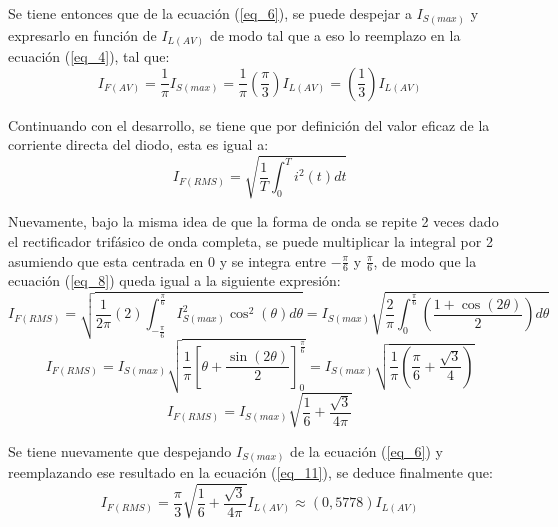 \documentclass[12pt,a4paper]{article}
\begin{document}
Se tiene entonces que de la ecuación (\ref{eq_6}), se puede despejar a $I_{S(max)}$ y expresarlo en función de $I_{L(AV)}$ de modo tal que a eso lo reemplazo en la ecuación (\ref{eq_4}), tal que:
\begin{equation}
    I_{F(AV)} = \frac{1}{\pi} I_{S(max)} = \frac{1}{\pi} \left(\frac{\pi}{3}\right) I_{L(AV)} = \left(\frac{1}{3}\right) I_{L(AV)}
    \label{eq_7}
\end{equation}

Continuando con el desarrollo, se tiene que por definición del valor eficaz de la corriente directa del diodo, esta es igual a:
\begin{equation}
    I_{F(RMS)} = \sqrt{\frac{1}{T} \int_{0}^{T} i^{2}(t)dt}
    \label{eq_8}
\end{equation}

Nuevamente, bajo la misma idea de que la forma de onda se repite 2 veces dado el rectificador trifásico de onda completa, se puede multiplicar la integral por 2 asumiendo que esta centrada en 0 y se integra entre $-\frac{\pi}{6}$ y $\frac{\pi}{6}$, de modo que la ecuación (\ref{eq_8}) queda igual a la siguiente expresión:
\begin{equation}
    I_{F(RMS)} = \sqrt{\frac{1}{2\pi} (2) \int_{-\frac{\pi}{6}}^{\frac{\pi}{6}} I^{2}_{S(max)} \cos^{2}(\theta) d\theta} = I_{S(max)} \sqrt{\frac{2}{\pi} \int_{0}^{\frac{\pi}{6}} \left(\frac{1 + \cos(2\theta)}{2} \right)d\theta}
    \label{eq_9}
\end{equation}
\begin{equation}
    I_{F(RMS)} = I_{S(max)} \sqrt{\frac{1}{\pi} \left[ \theta + \frac{\sin(2\theta)}{2}\right]_{0}^{\frac{\pi}{6}}} = I_{S(max)} \sqrt{\frac{1}{\pi} \left(\frac{\pi}{6} + \frac{\sqrt{3}}{4}\right)}
    \label{eq_10}
\end{equation}
\begin{equation}
    I_{F(RMS)} = I_{S(max)} \sqrt{\frac{1}{6} + \frac{\sqrt{3}}{4\pi}}
    \label{eq_11}
\end{equation}

Se tiene nuevamente que despejando $I_{S(max)}$ de la ecuación (\ref{eq_6}) y reemplazando ese resultado en la ecuación (\ref{eq_11}), se deduce finalmente que:
\begin{equation}
    I_{F(RMS)} = \frac{\pi}{3} \sqrt{\frac{1}{6} + \frac{\sqrt{3}}{4\pi}} I_{L(AV)} \approx (0,5778)I_{L(AV)}
    \label{eq_12}
\end{equation}
\end{document}
